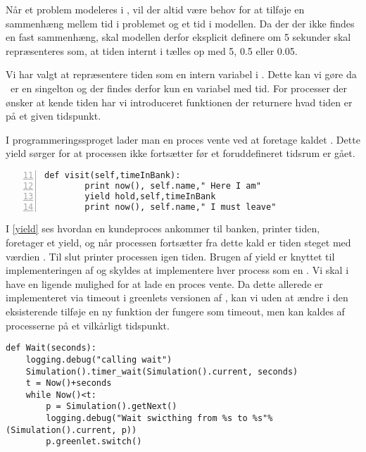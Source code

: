 Når et problem modeleres i \des, vil der altid være behov for at tilføje en sammenhæng mellem tid i problemet og et tid i modellen. Da der der ikke findes en fast sammenhæng, skal modellen derfor eksplicit definere om 5 sekunder skal repræsenteres som, at tiden internt i \pycsp tælles op med  5, 0.5 eller 0.05.

Vi har valgt at repræsentere tiden som en intern variabel i \sched. Dette kan vi gøre da \sched ~er en singelton og der findes derfor kun en variabel med tid. For processer der ønsker at kende tiden har vi introduceret funktionen  der returnere hvad tiden er på et given tidspunkt. 




I programmeringssproget \simpy lader man en proces vente ved at foretage kaldet . Dette yield sørger for at processen ikke fortsætter før et foruddefineret tidsrum er gået. 

\begin{lstlisting}[firstnumber=11 , stepnumber=2, numbers=left, float=hbtp, label=yield, caption= Et yield i \simpy (Taget fra Bank05.py i eksemplet fra \simpy)]
 def visit(self,timeInBank):       
        print now(), self.name," Here I am"             
        yield hold,self,timeInBank
        print now(), self.name," I must leave"  
\end{lstlisting}  

I \cref{yield} ses hvordan en kundeproces ankommer til banken, printer tiden, foretager et yield, og når processen fortsætter fra dette kald er tiden steget med værdien . Til slut printer processen igen tiden.  Brugen af yield er knyttet til implementeringen af \simpy og skyldes at \simpy implementere hver process som en . 
Vi skal i \pycsp have en ligende mulighed for at lade en proces vente. Da dette allerede er implementeret via timeout i greenlets versionen af \pycsp, kan vi uden at ændre i den eksisterende \sched tilføje en ny funktion  der fungere som timeout, men kan kaldes af processerne på et vilkårligt tidspunkt.
\begin{lstlisting}[firstnumber=20,float=hbtp, label=wait, caption=Wait i simuleringsversionen.]
def Wait(seconds):
    logging.debug("calling wait")
    Simulation().timer_wait(Simulation().current, seconds)
    t = Now()+seconds
    while Now()<t:
        p = Simulation().getNext() 
        logging.debug("Wait swicthing from %s to %s"%(Simulation().current, p))
        p.greenlet.switch()  
\end{lstlisting}

